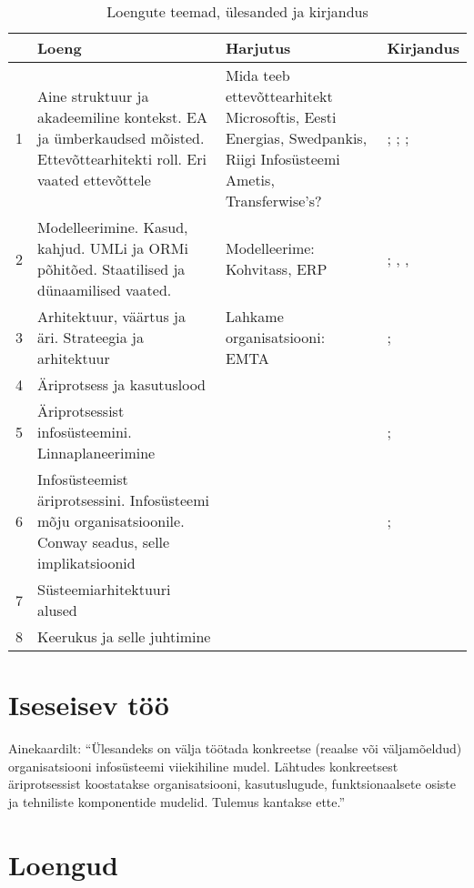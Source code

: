 \documentclass[nobib]{tufte-handout}
\begin{document}
\renewcommand{\arraystretch}{1.3}
\begin{table*}[ht]
\small
	\centering
	\selectfont
	\begin{tabular}{lp{5cm}p{6cm}p{4cm}}
		\toprule
		& Loeng & Harjutus & Kirjandus\\
		\midrule
		1 & Aine struktuur ja akadeemiline kontekst. EA ja ümberkaudsed mõisted. Ettevõttearhitekti roll. Eri vaated ettevõttele & Mida teeb ettevõttearhitekt Microsoftis, Eesti Energias, Swedpankis, Riigi Infosüsteemi Ametis, Transferwise's?  & \cite{parsons2005enterprise}; \cite{hickey}; \cite{sysengineering}; \cite{winter2006essential}\\
		2 & Modelleerimine. Kasud, kahjud. UMLi ja ORMi põhitõed. Staatilised ja dünaamilised vaated. & Modelleerime: Kohvitass, ERP & \cite{OPM}; \cite{heumann2005introduction}, \cite{box1976science}, \cite[peatükk 3]{ferenvcik2004survey}\\
		3 & Arhitektuur, väärtus ja äri. Strateegia ja arhitektuur & Lahkame organisatsiooni: EMTA & \cite{gadiesh2001transforming}; \cite{senge2002leader}\\
		4 & Äriprotsess ja kasutuslood & & \cite{wohed2006suitability}\\
		5 & Äriprotsessist infosüsteemini. Linnaplaneerimine & & \cite{longepe2003enterprise}; \cite{bertin2014urbanization}\\
		6 & Infosüsteemist äriprotsessini. Infosüsteemi mõju organisatsioonile. Conway seadus, selle implikatsioonid & & \cite{conway1968committees}; \cite{maccormack2012exploring}\\
		7 & Süsteemiarhitektuuri alused & & \cite{crawley2015system}\\
		8 & Keerukus ja selle juhtimine & & \cite{holt2017so}\\
	\end{tabular}
	\caption{Loengute teemad, ülesanded ja kirjandus}
	\label{tab:content}
\end{table*}

\section{Iseseisev töö}
Ainekaardilt: \enquote{Ülesandeks on välja töötada konkreetse (reaalse või väljamõeldud) organisatsiooni infosüsteemi viiekihiline mudel. Lähtudes konkreetsest äriprotsessist koostatakse organisatsiooni, kasutuslugude, funktsionaalsete osiste ja tehniliste komponentide mudelid. Tulemus kantakse ette.}

\section{Loengud}
\end{document}

